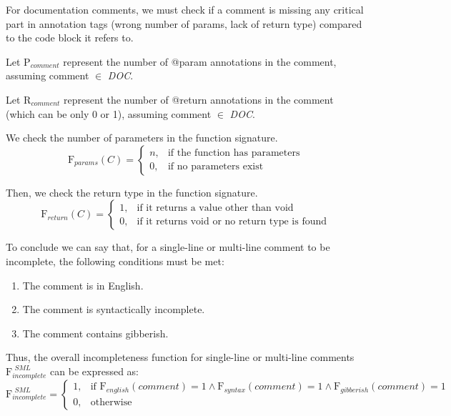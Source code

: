 \noindent For documentation comments, we must check if a comment is missing any critical part in annotation tags (wrong number of params, lack of return type) compared to the code block it refers to.

\noindent Let $\mathrm{P}_{comment}$ represent the number of @param annotations in the comment, assuming comment $\in$ \textit{DOC}.

\noindent Let $\mathrm{R}_{comment}$ represent the number of @return annotations in the comment (which can be only 0 or 1), assuming comment $\in$ \textit{DOC}.

\noindent We check the number of parameters in the function signature.
\begin{equation*}
	\mathrm{F}_{params}(C) = \begin{cases}
		n, & \text{if the function has parameters} \\
		0, & \text{if no parameters exist}
	\end{cases}
\end{equation*}

\noindent Then, we check the return type in the function signature.
\begin{equation*}
	\mathrm{F}_{return}(C) = \begin{cases}
		1, & \text{if it returns a value other than void
		} \\
		0, & \text{if it returns void or no return type is found}
	\end{cases}
\end{equation*}

\noindent To conclude we can say that, for a single-line or multi-line comment to be incomplete, the following conditions must be met:
	\begin{enumerate}
		\item The comment is in English.
		\item The comment is syntactically incomplete.
		\item The comment contains gibberish.
	\end{enumerate}
	
\noindent Thus, the overall incompleteness function for single-line or multi-line comments $\mathrm{F}_{incomplete}^{\textit{ SML}}$ can be expressed as:
\begin{equation*}
	\mathrm{F}_{incomplete}^{\textit{ SML}} = \begin{cases}
		1, & \text{if } \mathrm{F}_{english}(comment) = 1 \wedge \mathrm{F}_{syntax}(comment) = 1 \wedge \mathrm{F}_{gibberish}(comment) = 1 \\
		0, & \text{otherwise}
	\end{cases}
\end{equation*}

